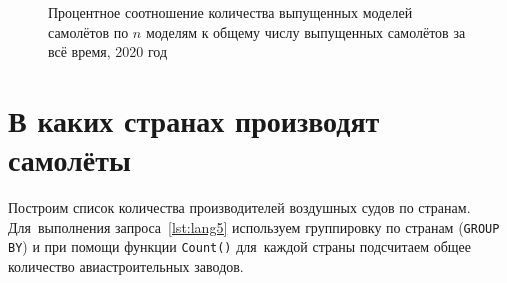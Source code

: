 \newpage 
\begin{figure*}[h!]

    \setlength{\fboxsep}{0pt}%
    \setlength{\fboxrule}{1pt}%
	\caption{Процентное соотношение количества выпущенных моделей самолётов по $n$ моделям к общему числу выпущенных самолётов за всё время, 2020 год}%
    \label{fig:Pareto_principle_diargam}%
\end{figure*}






\newpage 
\label{aircraft_question_4}
\section{В каких странах производят самолёты}

Построим список количества производителей воздушных судов по странам. 
Для~выполнения запроса~\ref{lst:lang5} 
используем группировку по странам (\lstinline|GROUP BY|) 
и при помощи функции \lstinline|Count()| 
для~каждой страны подсчитаем общее количество авиастроительных заводов.


